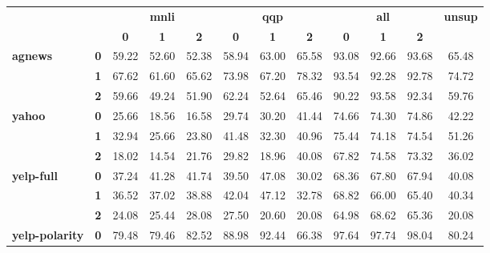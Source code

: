 \documentclass[11pt,a4paper]{article}
\begin{document}
\begin{table}[ht]
	\begin{tabular}{llcccccccccc}
		\toprule
		&            & \multicolumn{3}{c}{\textbf{mnli}}    & \multicolumn{3}{c}{\textbf{qqp}}     & \multicolumn{3}{c}{\textbf{all}}     & \multirow{2}{*}{\textbf{unsup}} \\
		&            & \textbf{0} & \textbf{1} & \textbf{2} & \textbf{0} & \textbf{1} & \textbf{2} & \textbf{0} & \textbf{1} & \textbf{2} &        	\\
		\hline
		\multirow{3}{*}{\textbf{agnews}}        & \textbf{0} & 59.22      & 52.60      & 52.38      & 58.94      & 63.00      & 65.58      & 93.08      & 92.66      & 93.68      & 65.48                           \\
		& \textbf{1} & 67.62      & 61.60      & 65.62      & 73.98      & 67.20      & 78.32      & 93.54      & 92.28      & 92.78      & 74.72                           \\
		& \textbf{2} & 59.66      & 49.24      & 51.90      & 62.24      & 52.64      & 65.46      & 90.22      & 93.58      & 92.34      & 59.76                           \\
		\hline
		\multirow{3}{*}{\textbf{yahoo}}         & \textbf{0} & 25.66      & 18.56      & 16.58      & 29.74      & 30.20      & 41.44      & 74.66      & 74.30      & 74.86      & 42.22                           \\
		& \textbf{1} & 32.94      & 25.66      & 23.80      & 41.48      & 32.30      & 40.96      & 75.44      & 74.18      & 74.54      & 51.26                           \\
		& \textbf{2} & 18.02      & 14.54      & 21.76      & 29.82      & 18.96      & 40.08      & 67.82      & 74.58      & 73.32      & 36.02                           \\
		\hline
		\multirow{3}{*}{\textbf{yelp-full}}     & \textbf{0} & 37.24      & 41.28      & 41.74      & 39.50      & 47.08      & 30.02      & 68.36      & 67.80      & 67.94      & 40.08                           \\
		& \textbf{1} & 36.52      & 37.02      & 38.88      & 42.04      & 47.12      & 32.78      & 68.82      & 66.00      & 65.40      & 40.34                           \\
		& \textbf{2} & 24.08      & 25.44      & 28.08      & 27.50      & 20.60      & 20.08      & 64.98      & 68.62      & 65.36      & 20.08                           \\
		\hline
		\multirow{3}{*}{\textbf{yelp-polarity}} & \textbf{0} & 79.48      & 79.46      & 82.52      & 88.98      & 92.44      & 66.38      & 97.64      & 97.74      & 98.04      & 80.24                           \\

\end{tabular}
\end{table}
\end{document}
